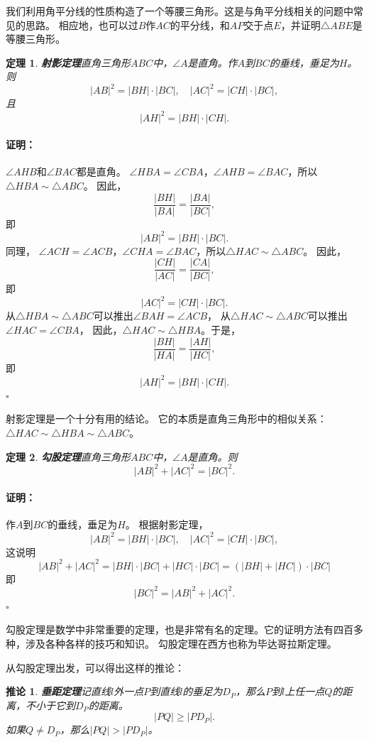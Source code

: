 \documentclass[12pt,UTF8]{ctexbook}
\newtheorem{tm}{定理}[section]
\newenvironment{proof2}{\paragraph{\textbf{证明：}}}{\hfill$\square$}
\newtheorem{cor}{推论}[pp]
\begin{document}
我们利用角平分线的性质构造了一个等腰三角形。这是与角平分线相关的问题中常见的思路。
相应地，也可以过$B$作$AC$的平分线，和$AP$交于点$E$，并证明$\triangle ABE$是等腰三角形。

\begin{tm}{\textbf{射影定理}}\label{tm:0-2-2}
    直角三角形$ABC$中，$\angle A$是直角。作$A$到$BC$的垂线，垂足为$H$。则
    $$ |AB|^2 = |BH|\cdot |BC|, \quad |AC|^2 = |CH|\cdot |BC|,$$
    且
    $$|AH|^2 = |BH| \cdot |CH|.$$
\end{tm}
\begin{proof2}
    $\angle AHB$和$\angle BAC$都是直角。
    $\angle HBA = \angle CBA$，$\angle AHB = \angle BAC$，所以$\triangle HBA \sim \triangle ABC$。
    因此，
    $$ \frac{|BH|}{|BA|} = \frac{|BA|}{|BC|},$$
    即
    $$ |AB|^2 = |BH|\cdot |BC|.$$
    同理，
    $\angle ACH = \angle ACB$，$\angle CHA = \angle BAC$，所以$\triangle HAC \sim \triangle ABC$。
    因此，
    $$ \frac{|CH|}{|AC|} = \frac{|CA|}{|BC|},$$
    即
    $$ |AC|^2 = |CH|\cdot |BC|.$$
    从$\triangle HBA \sim \triangle ABC$可以推出$\angle BAH = \angle ACB$，
    从$\triangle HAC \sim \triangle ABC$可以推出$\angle HAC = \angle CBA$，
    因此，$\triangle HAC \sim \triangle HBA$。于是，
    $$ \frac{|BH|}{|HA|} = \frac{|AH|}{|HC|},$$
    即
    $$|AH|^2 = |BH| \cdot |CH|.$$
\end{proof2}

射影定理是一个十分有用的结论。
它的本质是直角三角形中的相似关系：$\triangle HAC \sim \triangle HBA \sim \triangle ABC$。

\begin{tm}{\textbf{勾股定理}}\label{tm:0-2-3}
    直角三角形$ABC$中，$\angle A$是直角。则
    $$|AB|^2+|AC|^2 = |BC|^2.$$
\end{tm}
\begin{proof2}
    作$A$到$BC$的垂线，垂足为$H$。
    根据射影定理，    
    $$ |AB|^2 = |BH|\cdot |BC|, \quad |AC|^2 = |CH|\cdot |BC|,$$
    这说明
    $$ |AB|^2+|AC|^2 = |BH|\cdot |BC| + |HC|\cdot |BC| = (|BH| + |HC|)\cdot |BC|$$
    即
    $$ |BC|^2 = |AB|^2+|AC|^2.$$
\end{proof2}

勾股定理是数学中非常重要的定理，也是非常有名的定理。它的证明方法有四百多种，涉及各种各样的技巧和知识。
勾股定理在西方也称为毕达哥拉斯定理。

从勾股定理出发，可以得出这样的推论：
\begin{cor}{\textbf{垂距定理}}\label{cr:0-2-0}
    记直线$l$外一点$P$到直线$l$的垂足为$D_P$，那么$P$到$l$上任一点$Q$的距离，不小于它到$D_P$的距离。
    $$ |PQ | \geqslant |PD_P|.$$
    如果$Q \neq D_P$，那么$|PQ| > |PD_P|$。
\end{cor}
\end{document}
